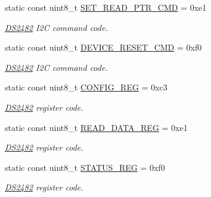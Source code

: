 \begin{DoxyCompactItemize}
\mbox{\label{class_d_s2482_command_ae76f74221e3defa47849bc4d6314515e}} 
static const uint8\+\_\+t \mbox{\hyperlink{class_d_s2482_command_ae76f74221e3defa47849bc4d6314515e}{S\+E\+T\+\_\+\+R\+E\+A\+D\+\_\+\+P\+T\+R\+\_\+\+C\+MD}} = 0xe1
\begin{DoxyCompactList}\small\item\em \mbox{\hyperlink{class_d_s2482}{D\+S2482}} I2C command code. \end{DoxyCompactList}\item 
\mbox{\label{class_d_s2482_command_af83f32cef55ec8e06a7b11af7c2d9250}} 
static const uint8\+\_\+t \mbox{\hyperlink{class_d_s2482_command_af83f32cef55ec8e06a7b11af7c2d9250}{D\+E\+V\+I\+C\+E\+\_\+\+R\+E\+S\+E\+T\+\_\+\+C\+MD}} = 0xf0
\begin{DoxyCompactList}\small\item\em \mbox{\hyperlink{class_d_s2482}{D\+S2482}} I2C command code. \end{DoxyCompactList}\item 
\mbox{\label{class_d_s2482_command_ab0233c4f4a4b86917ae269a23424666e}} 
static const uint8\+\_\+t \mbox{\hyperlink{class_d_s2482_command_ab0233c4f4a4b86917ae269a23424666e}{C\+O\+N\+F\+I\+G\+\_\+\+R\+EG}} = 0xc3
\begin{DoxyCompactList}\small\item\em \mbox{\hyperlink{class_d_s2482}{D\+S2482}} register code. \end{DoxyCompactList}\item 
\mbox{\label{class_d_s2482_command_aea747fc26b19aa8bb8fa7e507a879f73}} 
static const uint8\+\_\+t \mbox{\hyperlink{class_d_s2482_command_aea747fc26b19aa8bb8fa7e507a879f73}{R\+E\+A\+D\+\_\+\+D\+A\+T\+A\+\_\+\+R\+EG}} = 0xe1
\begin{DoxyCompactList}\small\item\em \mbox{\hyperlink{class_d_s2482}{D\+S2482}} register code. \end{DoxyCompactList}\item 
\mbox{\label{class_d_s2482_command_a3f900fad0a5a64ab1ea5f3e1e8fba112}} 
static const uint8\+\_\+t \mbox{\hyperlink{class_d_s2482_command_a3f900fad0a5a64ab1ea5f3e1e8fba112}{S\+T\+A\+T\+U\+S\+\_\+\+R\+EG}} = 0xf0
\begin{DoxyCompactList}\small\item\em \mbox{\hyperlink{class_d_s2482}{D\+S2482}} register code. \end{DoxyCompactList}\item 

\end{DoxyCompactItemize}
